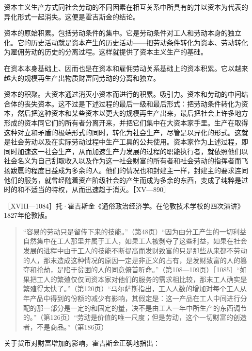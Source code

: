 资本主义生产方式同社会劳动的不同因素在相互关系中所具有的并以资本为代表的异化形式一起消失。这便是霍吉斯金的结论。


资本的原始积累。包括劳动条件的集中。它是劳动条件对工人和劳动本身的独立化。它的历史活动就是资本产生的历史活动——把劳动条件转化为资本、劳动转化为雇佣劳动的历史的分离过程。这样就提供了资本主义生产的基础。

在资本本身基础上、因而也是在资本和雇佣劳动关系基础上的资本积累。它以越来越大的规模再生产出物质财富同劳动的分离和独立。

资本的积聚。大资本通过消灭小资本而进行的积累。吸引力。资本和劳动的中间结合体的丧失资本。这不过是下述过程的最后一级和最后形式：把劳动条件转化为资本，然后把这种资本和某些资本以更大的规模再生产出来，最后把社会上许多地方形成的资本同它们的所有者分离开来，并把它们集中在大资本家手里。生产在取得这种对立和矛盾的极端形式的同时，转化为社会生产，尽管是以异化的形式。这就是社会劳动以及在实际劳动过程中生产工具的公共使用。资本家作为上述过程，即同时加速这一社会生产，从而加速生产力发展的过程的职能执行者，就依照他们以社会名义为自己刮取收入以及作为这一社会财富的所有者和社会劳动的指挥者而飞扬跋扈的程度日益成为多余的人。他们的情况也和封建主一样，封建主的要求连同他们的服务，就曾经随着资产阶级社会的产生而成为多余的东西，变成了纯粹是过时的和不适当的特权，从而迅速趋于消灭。［XV—890］


［XVIII—1084］托·霍吉斯金《通俗政治经济学。在伦敦技术学校的四次演讲》1827年伦敦版。

\begin{quote}{“容易的劳动只是留传下来的技能。”（第48页）“因为由分工产生的一切利益自然集中在工人那里并属于工人，如果工人被剥夺了这些利益，如果在社会发展的进程中由于工人的技能不断提高而发财致富的只是那些从来都不劳动的人，那末造成这种情况的原因一定是非正义的占有，是发财致富的人的篡夺和抢劫，是陷于贫困的人的同意俯首听命。”（第108—109页）［1085］“如果把工人的繁殖仅仅同资本家对他们的服务的需求相比较，那末工人确实是繁殖得太快了。”（第120页）“马尔萨斯指出，工人人数的增加对每个工人从年产品中得到的份额的减少有影响，其假定是：这一产品在工人中间进行分配的那一部分是一定的和固定的量，决不是由工人一年中所生产的东西调节的。”（第126页）“劳动是价值的唯一尺度；但是劳动，这个一切财富的创造者，不是商品。”（第186页）}\end{quote}

关于货币对财富增加的影响，霍吉斯金正确地指出：

